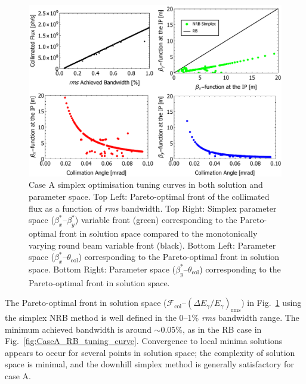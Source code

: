 \documentclass[../main.tex]{subfiles}
\begin{document}
\begin{figure}[!h]
\centering
\includegraphics[width=\textwidth]{Figures/Optimisation_and_Characterisation_of_Inverse_Compton_Scattering_Sources/Case_A_simplex_Tuning_Curves.pdf}
\caption{Case A simplex optimisation tuning curves in both solution and parameter space. Top Left: Pareto-optimal front of the collimated flux as a function of \textit{rms} bandwidth. Top Right: Simplex parameter space ($\beta_{x}^{*}$--$\beta_{y}^{*}$) variable front (green) corresponding to the Pareto-optimal front in solution space compared to the monotonically varying round beam variable front (black). Bottom Left: Parameter space ($\beta_{x}^{*}$--$\theta_{\mathrm{col}}$) corresponding to the Pareto-optimal front in solution space. Bottom Right: Parameter space ($\beta_{y}^{*}$--$\theta_{\mathrm{col}}$) corresponding to the Pareto-optimal front in solution space.}
\label{fig:case_A_simplex_tuning_curves}
\end{figure}

The Pareto-optimal front in solution space ($\mathcal{F}_{\mathrm{col}}$--$\left(\Delta E_{\gamma}/E_{\gamma}\right)_{\mathrm{rms}}$) in Fig.~\ref{fig:case_A_simplex_tuning_curves} using the simplex NRB method is well defined in the 0--1\% \textit{rms} bandwidth range. The minimum achieved bandwidth is around $\sim0.05$\%, as in the RB case in Fig.~\ref{fig:CaseA_RB_tuning_curve}. Convergence to local minima solutions appears to occur for several points in solution space; the complexity of solution space is minimal, and the downhill simplex method is generally satisfactory for case A.    
\end{document}
